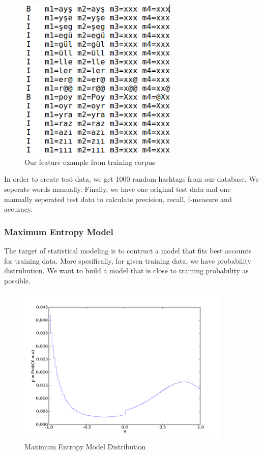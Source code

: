 \documentclass[12pt]{comjnl}
\begin{document}
\begin{figure}[htbp]
\centering
\includegraphics[width=3in]{train.png}
\caption{Our feature example from training corpus}\label{fig:model}
\end{figure}

In order to create test data, we get 1000 random hashtags from our database. We seperate words manually. Finally, we have one original test data and one manually seperated test data to calculate precision, recall, f-measure and accuracy.

\subsubsection{Maximum Entropy Model}

The target of statistical modeling is to contruct a model that fits best accounts for training data. More spesifically, for given training data, we have probability distrubution. We want to build a model that is close to training probability as possible.

\begin{figure}[htbp]
\centering
\includegraphics[width=4in]{mem.jpg}
\caption{Maximum Entropy Model Distribution}\label{fig:model}
\end{figure}
\end{document}
